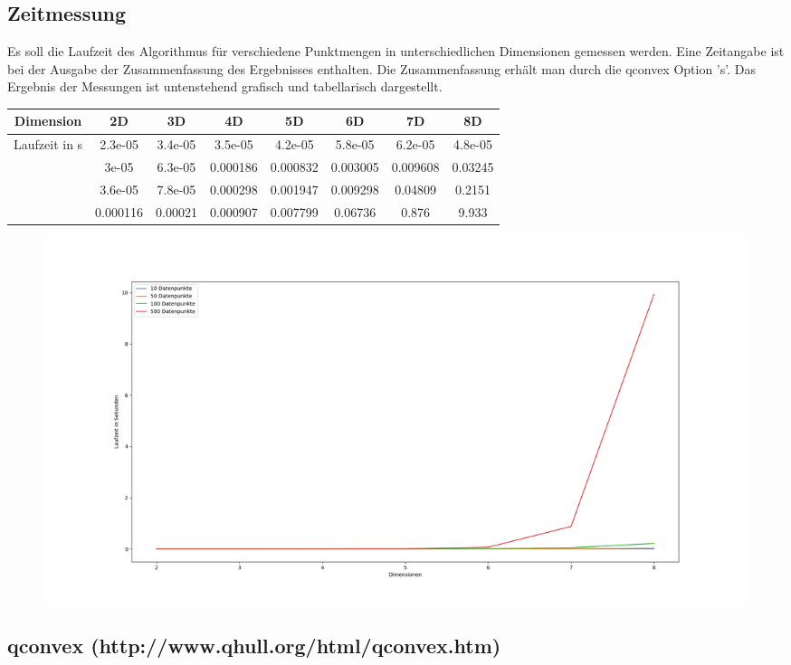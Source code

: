 \documentclass[12pt]{scrartcl}
\begin{document}
\subsection{Zeitmessung}
Es soll die Laufzeit des Algorithmus für verschiedene Punktmengen in unterschiedlichen Dimensionen gemessen werden.  Eine Zeitangabe ist bei der Ausgabe der Zusammenfassung des Ergebnisses enthalten. Die Zusammenfassung erhält man durch die qconvex Option 's'. Das Ergebnis der Messungen ist untenstehend grafisch und tabellarisch dargestellt.
\begin{center}
\begin{tabular}{||c | c c c c c c c||} 
    \hline
    Dimension & 2D &       3D &      4D &       5D &       6D &       7D &       8D      \\
    \hline \hline
    \multirow{4}{*}{Laufzeit in s} & 2.3e-05 &  3.4e-05 & 3.5e-05 &  4.2e-05 &  5.8e-05 &  6.2e-05 &  4.8e-05 \\ \cline{2-8}
                                   & 3e-05 &    6.3e-05 & 0.000186 & 0.000832 & 0.003005 & 0.009608 & 0.03245 \\ \cline{2-8}
                                   & 3.6e-05 &  7.8e-05 & 0.000298 & 0.001947 & 0.009298 & 0.04809 &  0.2151  \\ \cline{2-8}
                                   & 0.000116 & 0.00021 & 0.000907 & 0.007799 & 0.06736 &  0.876 &    9.933   \\ \hline
\end{tabular}
\end{center}

\begin{figure}[ht]
    \centering
    \includegraphics[scale=0.32]{runtimes.png}
\end{figure}


\subsection{qconvex (http://www.qhull.org/html/qconvex.htm)}
\end{document}
